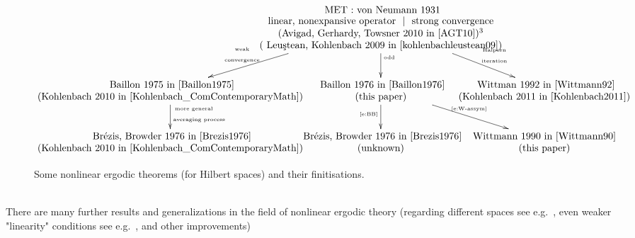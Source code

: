 \begin{figure}[htb]%
\[
\begin{xy}
  \xymatrix@C=-50pt@M=3pt{
  		  & \txt{ MET : von Neumann  1931 \\ linear, nonexpansive operator $\ |\ $ strong convergence\\(Avigad, Gerhardy, Towsner 2010 in~\cite{AGT10})\footnotemark\\ ( Leu{\c{s}}tean, Kohlenbach 2009 in~\cite{kohlenbachleustean09})
 		  } \ar[dl]_-{\txt{\tiny weak\\\tiny convergence}} \ar[d]^{\txt{\tiny odd}} \ar[dr]^-{\txt{\tiny $ $\hspace{2ex} Halpern\\ \tiny $ $\hspace{2ex} iteration}} &  \\
        \txt{ 					Baillon 1975 in~\cite{Baillon1975} \\ (Kohlenbach 2010 in~\cite{Kohlenbach_ComContemporaryMath})} \ar[d]^{\txt{\tiny more general\hspace{5ex}$ $\\ \vspace{-7pt}\tiny averaging process}} &  
        \txt{ Baillon 1976 in~\cite{Baillon1976} \\ (this paper) } \ar[d]_{\txt{\tiny \eqref{e:BB}}} \ar[dr]^{\txt{\tiny \eqref{e:W-assym}}} &  
        \txt{ Wittman 1992 in~\cite{Wittmann92} \\ (Kohlenbach 2011 in~\cite{Kohlenbach2011})}        \\
         \txt{ Br\'ezis, Browder 1976 in~\cite{Brezis1976} \\ (Kohlenbach 2010 in~\cite{Kohlenbach_ComContemporaryMath}) }  & \txt{ Br\'ezis, Browder 1976 in~\cite{Brezis1976} \\ (unknown) } & \txt{Wittmann 1990 in~\cite{Wittmann90} \\ (this paper)} &   
   }
\end{xy}
\]
\caption{Some nonlinear ergodic theorems (for Hilbert spaces) and their finitisations.}%
\label{f:METtree}
\end{figure}
 \\					
There are many further results and generalizations
in the field of nonlinear ergodic theory 
(regarding different spaces see e.g.~\cite{Bruck1979,Hirano1982}, even weaker "linearity" conditions see e.g.~\cite{Miyadera1997,Rouhani2001}, and other improvements) 
